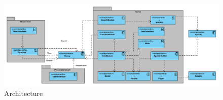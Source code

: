 \label{sec:architecture}

\begin{figure}
  \centering
  \includegraphics[angle=90,width=0.6\linewidth]{Images/Arkitektur.pdf}
  \caption{Architecture}
  \label{fig:architecture}
\end{figure}
